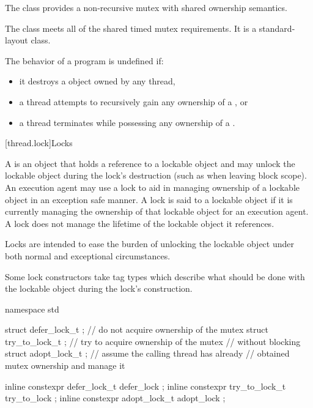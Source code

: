 \pnum
The class  provides a non-recursive mutex with shared
ownership semantics.

\pnum
The class  meets
all of the shared timed mutex requirements.
It is a standard-layout class.

\pnum
The behavior of a program is undefined if:
\begin{itemize}
\item it destroys a  object owned by any thread,
\item a thread attempts to recursively gain any ownership of a , or
\item a thread terminates while possessing any ownership of a .
\end{itemize}

[thread.lock]{Locks}

\pnum
A  is an object that holds a reference to a lockable object and may unlock the
lockable object during the lock's destruction (such as when leaving block scope). An execution
agent may use a lock to aid in managing ownership of a lockable object in an exception safe
manner. A lock is said to  a lockable object if it is currently managing the
ownership of that lockable object for an execution agent. A lock does not manage the lifetime
of the lockable object it references.
\begin{note}
Locks are intended to ease the burden of
unlocking the lockable object under both normal and exceptional circumstances.
\end{note}

\pnum
Some lock constructors take tag types which describe what should be done with the lockable
object during the lock's construction.

%
%
%
%
%
%
\begin{codeblock}
namespace std {
  struct defer_lock_t  { };     // do not acquire ownership of the mutex
  struct try_to_lock_t { };     // try to acquire ownership of the mutex
                                // without blocking
  struct adopt_lock_t  { };     // assume the calling thread has already
                                // obtained mutex ownership and manage it

  inline constexpr defer_lock_t   defer_lock { };
  inline constexpr try_to_lock_t  try_to_lock { };
  inline constexpr adopt_lock_t   adopt_lock { };
}
\end{codeblock}

